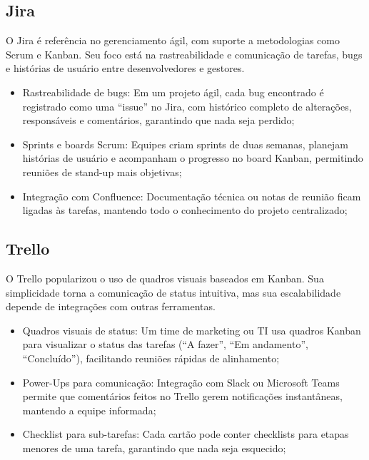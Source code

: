 \documentclass[12pt]{article}
\begin{document}
\subsection{Jira}
O Jira é referência no gerenciamento ágil, com suporte a metodologias como Scrum e Kanban. Seu foco está na rastreabilidade e comunicação de tarefas, bugs e histórias de usuário entre desenvolvedores e gestores.
\begin{itemize}
    \item Rastreabilidade de bugs: Em um projeto ágil, cada bug encontrado é registrado como uma “issue” no Jira, com histórico completo de alterações, responsáveis e comentários, garantindo que nada seja perdido;
    \item Sprints e boards Scrum: Equipes criam sprints de duas semanas, planejam histórias de usuário e acompanham o progresso no board Kanban, permitindo reuniões de stand-up mais objetivas;
    \item Integração com Confluence: Documentação técnica ou notas de reunião ficam ligadas às tarefas, mantendo todo o conhecimento do projeto centralizado;
\end{itemize}
\clearpage
\subsection{Trello}
O Trello popularizou o uso de quadros visuais baseados em Kanban. Sua simplicidade torna a comunicação de status intuitiva, mas sua escalabilidade depende de integrações com outras ferramentas.
\begin{itemize}
    \item Quadros visuais de status: Um time de marketing ou TI usa quadros Kanban para visualizar o status das tarefas (“A fazer”, “Em andamento”, “Concluído”), facilitando reuniões rápidas de alinhamento;
    \item Power-Ups para comunicação: Integração com Slack ou Microsoft Teams permite que comentários feitos no Trello gerem notificações instantâneas, mantendo a equipe informada;
    \item Checklist para sub-tarefas: Cada cartão pode conter checklists para etapas menores de uma tarefa, garantindo que nada seja esquecido;
\end{itemize}
\end{document}
